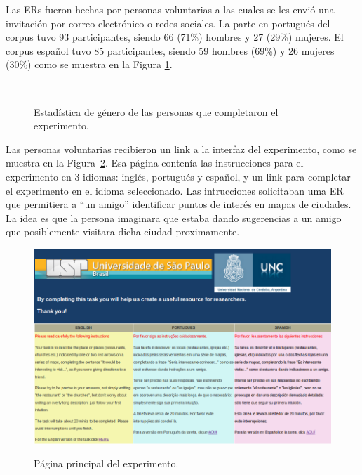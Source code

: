 Las ERs fueron hechas por personas voluntarias a las cuales se les envi\'o una invitaci\'on por correo electr\'onico o redes sociales. La parte en portugu\'es del corpus tuvo 93 participantes, siendo 66 (71\%) hombres y 27 (29\%) mujeres. El corpus espa\~nol tuvo 85 participantes, siendo 59 hombres (69\%) y 26 mujeres (30\%) como se muestra en la Figura \ref{estadistica-mf}.
\begin{figure}[ht]
\begin{center}
\\[0pt]
\caption{Estad\'istica de g\'enero de las personas que completaron el experimento.}
\label{estadistica-mf}
\end{center}
\end{figure}

Las personas voluntarias recibieron un link a la interfaz del experimento, como se muestra en la Figura~\ref{fig_pagPrincipal_seleccion_idioma}. Esa p\'agina conten\'{i}a las instrucciones para el experimento en 3 idiomas: ingl\'es, portugu\'es y espa\~{n}ol, y un link para completar el experimento en el idioma seleccionado. Las intrucciones solicitaban uma ER que permitiera a ``un amigo'' identificar puntos de inter\'es en mapas de ciudades. La idea es que la persona imaginara que estaba dando sugerencias a un amigo que posiblemente visitara dicha ciudad proximamente. 
\begin{figure}[ht]
\begin{center}
\includegraphics[width=17cm]{images/pagPrincipal.png}\\[0pt]
\caption{P\'agina principal del experimento.}
\label{fig_pagPrincipal_seleccion_idioma}
\end{center}
\end{figure}


